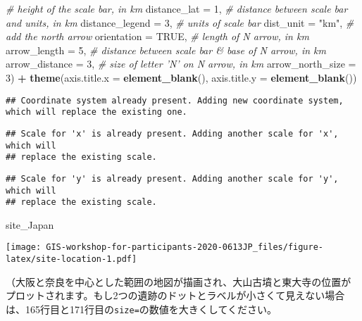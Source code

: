 \documentclass[
  xelatex,ja=standard]{bxjsarticle}
\newenvironment{Shaded}{\begin{snugshade}}{\end{snugshade}}
\newcommand{\CommentTok}[1]{\textcolor[rgb]{0.56,0.35,0.01}{\textit{#1}}}
\newcommand{\DataTypeTok}[1]{\textcolor[rgb]{0.13,0.29,0.53}{#1}}
\newcommand{\DecValTok}[1]{\textcolor[rgb]{0.00,0.00,0.81}{#1}}
\newcommand{\KeywordTok}[1]{\textcolor[rgb]{0.13,0.29,0.53}{\textbf{#1}}}
\newcommand{\NormalTok}[1]{#1}
\newcommand{\OperatorTok}[1]{\textcolor[rgb]{0.81,0.36,0.00}{\textbf{#1}}}
\newcommand{\OtherTok}[1]{\textcolor[rgb]{0.56,0.35,0.01}{#1}}
\newcommand{\StringTok}[1]{\textcolor[rgb]{0.31,0.60,0.02}{#1}}
\begin{document}
\begin{Shaded}
\begin{Highlighting}[]
    \CommentTok{# height of the scale bar, in km}
    \DataTypeTok{distance_lat =} \DecValTok{1}\NormalTok{,}
    \CommentTok{# distance between scale bar and units, in km}
    \DataTypeTok{distance_legend =} \DecValTok{3}\NormalTok{,}
    \CommentTok{# units of scale bar}
    \DataTypeTok{dist_unit =} \StringTok{"km"}\NormalTok{,}
    \CommentTok{# add the north arrow}
    \DataTypeTok{orientation =} \OtherTok{TRUE}\NormalTok{,}
    \CommentTok{# length of N arrow, in km}
    \DataTypeTok{arrow_length =} \DecValTok{5}\NormalTok{,}
    \CommentTok{# distance between scale bar & base of N arrow, in km}
    \DataTypeTok{arrow_distance =} \DecValTok{3}\NormalTok{,}
    \CommentTok{# size of letter 'N' on N arrow, in km}
    \DataTypeTok{arrow_north_size =} \DecValTok{3}\NormalTok{) }\OperatorTok{+}
\StringTok{  }\KeywordTok{theme}\NormalTok{(}\DataTypeTok{axis.title.x =} \KeywordTok{element_blank}\NormalTok{(),}
        \DataTypeTok{axis.title.y =} \KeywordTok{element_blank}\NormalTok{())}
\end{Highlighting}
\end{Shaded}

\begin{verbatim}
## Coordinate system already present. Adding new coordinate system, which will replace the existing one.
\end{verbatim}

\begin{verbatim}
## Scale for 'x' is already present. Adding another scale for 'x', which will
## replace the existing scale.
\end{verbatim}

\begin{verbatim}
## Scale for 'y' is already present. Adding another scale for 'y', which will
## replace the existing scale.
\end{verbatim}

\begin{Shaded}
\begin{Highlighting}[]
\NormalTok{site_Japan}
\end{Highlighting}
\end{Shaded}

\texttt{[image: GIS-workshop-for-participants-2020-0613JP\_files/figure-latex/site-location-1.pdf]}

（大阪と奈良を中心とした範囲の地図が描画され、大山古墳と東大寺の位置がプロットされます。もし2つの遺跡のドットとラベルが小さくて見えない場合は、165行目と171行目の\texttt{size=}の数値を大きくしてください。
\end{document}
